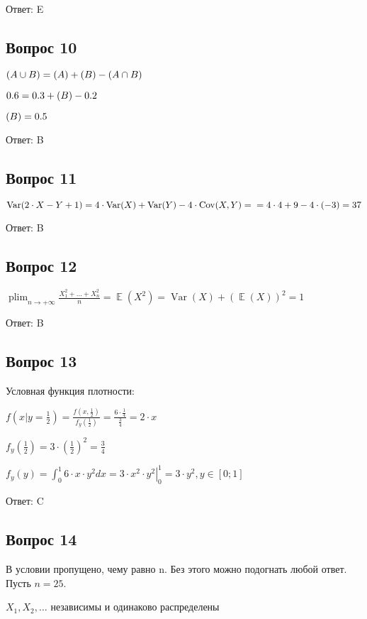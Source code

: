 \documentclass[a4paper]{article} %
\DeclareMathOperator*\plim{plim}
\DeclareMathOperator{\Var}{Var}
\DeclareMathOperator{\Cov}{Cov}
\DeclareMathOperator{\E}{\mathbb{E}}
\let\P\relax
\DeclareMathOperator{\P}{\mathbb{P}}
\begin{document}
\begin{flushleft}
Ответ: E

\subsection{Вопрос 10}

$\P(A\cup B) = \P(A) + \P(B) - \P(A\cap B)$

$0.6 = 0.3 + \P(B) - 0.2$

$\P(B) = 0.5$

Ответ: B

\subsection{Вопрос 11}

$\Var(2\cdot X - Y + 1) = 4\cdot \Var(X) + \Var(Y) - 4 \cdot \Cov(X,Y) = \\ = 4 \cdot 4 + 9 - 4 \cdot (-3) = 37$

Ответ: B

\subsection{Вопрос 12}

$\plim _{n\rightarrow +\infty}\frac{X_{1}^2 + \dots + X_{n}^2}{n} = \E(X^2) = \Var(X) +(\E(X))^2 = 1$

Ответ: B

\subsection{Вопрос 13}

Условная функция плотности:

$f(x|y=\frac{1}{2}) = \frac{f(x,\frac{1}{2})}{f_{y}(\frac{1}{2})} = \frac{6\cdot\frac{1}{4}}{\frac{3}{4}} = 2 \cdot x$

$f_{y}(\frac{1}{2}) = 3 \cdot (\frac{1}{2})^2 = \frac{3}{4}$

$f_{y}(y) = \int_0^1 6\cdot x\cdot y^2 dx = \left.3 \cdot x^2 \cdot y^2\right|_0^1  = 3 \cdot y^2, y \in [0;1] $

Ответ: C

\subsection{Вопрос 14}

В условии пропущено, чему равно n. Без этого можно подогнать любой ответ. Пусть $n = 25$.

$X_{1}, X_{2}, \dots$ независимы и одинаково распределены


\end{flushleft}
\end{document}

